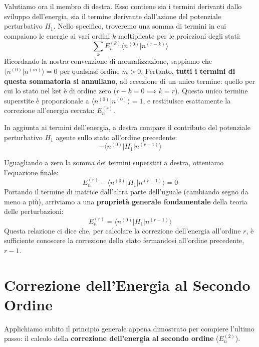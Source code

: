 Valutiamo ora il membro di destra. Esso contiene sia i termini derivanti dallo sviluppo dell'energia, sia il termine derivante dall'azione del potenziale perturbativo $H_1$.
Nello specifico, troveremo una somma di termini in cui compaiono le energie ai vari ordini $k$ moltiplicate per le proiezioni degli stati:
\begin{equation}
\sum_{k} E_n^{(k)} \langle n^{(0)} | n^{(r-k)} \rangle
\end{equation}
Ricordando la nostra convenzione di normalizzazione, sappiamo che $\langle n^{(0)} \vert{} n^{(m)} \rangle = 0$ per qualsiasi ordine $m > 0$. Pertanto, \textbf{tutti i termini di questa sommatoria si annullano}, ad eccezione di un unico termine: quello per cui lo stato nel ket è di ordine zero ($r-k = 0 \implies k=r$).
Questo unico termine superstite è proporzionale a $\langle n^{(0)} \vert{} n^{(0)} \rangle = 1$, e restituisce esattamente la correzione all'energia cercata: $E_n^{(r)}$.

In aggiunta ai termini dell'energia, a destra compare il contributo del potenziale perturbativo $H_1$ agente sullo stato all'ordine precedente:
\begin{equation}
- \langle n^{(0)} | H_1 | n^{(r-1)} \rangle
\end{equation}

Uguagliando a zero la somma dei termini superstiti a destra, otteniamo l'equazione finale:
\begin{equation}
E_n^{(r)} - \langle n^{(0)} | H_1 | n^{(r-1)} \rangle = 0
\end{equation}
Portando il termine di matrice dall'altra parte dell'uguale (cambiando segno da meno a più), arriviamo a una \textbf{proprietà generale fondamentale} della teoria delle perturbazioni:
\begin{equation}
E_n^{(r)} = \langle n^{(0)} | H_1 | n^{(r-1)} \rangle
\end{equation}
Questa relazione ci dice che, per calcolare la correzione dell'energia all'ordine $r$, è sufficiente conoscere la correzione dello stato fermandosi all'ordine precedente, $r-1$.

\section{Correzione dell'Energia al Secondo Ordine}

Applichiamo subito il principio generale appena dimostrato per compiere l'ultimo passo: il calcolo della \textbf{correzione dell'energia al secondo ordine} ($E_n^{(2)}$).

